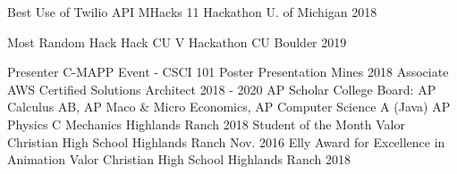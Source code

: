 

\begin{cvhonors}

  \cvhonor
    {Best Use of Twilio API} %
    {MHacks 11 Hackathon}
    {U. of Michigan} %
    {2018} %

  \cvhonor
    {Most Random Hack} %
    {Hack CU V Hackathon}
    {CU Boulder} %
    {2019} %

    \cvhonor
    {Presenter} %
    {C-MAPP Event - CSCI 101 Poster Presentation}
    {Mines} %
    {2018} %
  \cvhonor
    {Associate} %
    {AWS Certified Solutions Architect }
    {} %
    {2018 - 2020} %
    \cvhonor
    {AP Scholar} %
    {College Board: AP Calculus AB, AP Maco \& Micro Economics, AP
      Computer Science A (Java) AP Physics C Mechanics}
    {Highlands Ranch} %
    {2018} %
  \cvhonor
    {Student of the Month} %
    {Valor Christian High School}
    {Highlands Ranch} %
    {Nov. 2016} %
    \cvhonor
    {Elly Award for Excellence in Animation} %
    {Valor Christian High School}
    {Highlands Ranch} %
    {2018} %
    
\end{cvhonors}
